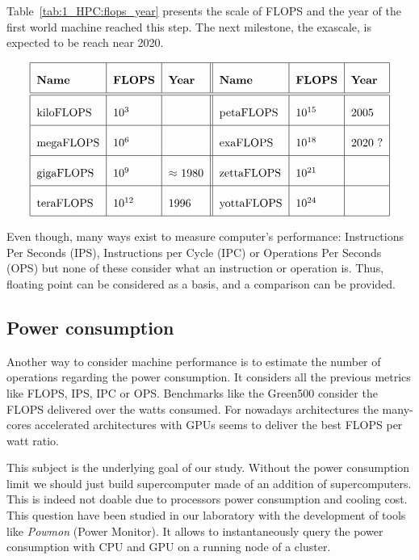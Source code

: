 Table~\ref{tab:1_HPC:flops_year} presents the scale of FLOPS and the year of the first world machine reached this step.
The next milestone, the exascale, is expected to be reach near 2020.  

\begin{table}
\[\arraycolsep=1.4pt\def\arraystretch{2.2}
\begin{tabular}{| l | l | l || l | l | l |}
\hline
	\textbf{Name} & \textbf{FLOPS} & \textbf{Year} & \textbf{Name} & \textbf{FLOPS} & \textbf{Year} \\
	\hline
	\hline
	kiloFLOPS & $10^{3}$ & & petaFLOPS  & $10^{15}$ & 2005 \\ 
	\hline
	megaFLOPS & $10^{6}$ & & exaFLOPS   & $10^{18}$ & 2020 ? \\
	\hline
	gigaFLOPS & $10^{9}$ & $\approx$ 1980  & zettaFLOPS & $10^{21}$ & \\
	\hline
	teraFLOPS & $10^{12}$ & 1996 & yottaFLOPS & $10^{24}$ & \\
	\hline
	\end{tabular}
	\]
	\caption{Floating-point Operation per Second and years of reach in HPC.}
	\label{tab:1_HPC:flops_year}
\end{table}

Even though, many ways exist to measure computer's performance: Instructions Per Seconds (IPS), Instructions per Cycle (IPC) or Operations Per Seconds (OPS) but none of these consider what an instruction or operation is. 
Thus, floating point can be considered as a basis, and a comparison can be provided. 


\subsection{Power consumption}
Another way to consider machine performance is to estimate the number of operations regarding the power consumption. 
It considers all the previous metrics like FLOPS, IPS, IPC or OPS. 
Benchmarks like the Green500 consider the FLOPS delivered over the watts consumed. 
For nowadays architectures the many-cores accelerated architectures with GPUs seems to deliver the best FLOPS per watt ratio.

This subject is the underlying goal of our study. 
Without the power consumption limit we should just build supercomputer made of an addition of supercomputers. 
This is indeed not doable due to processors power consumption and cooling cost.
This question have been studied in our laboratory with the development of tools like \textit{Powmon} (Power Monitor).
It allows to instantaneously query the power consumption with CPU and GPU on a running node of a cluster. 

